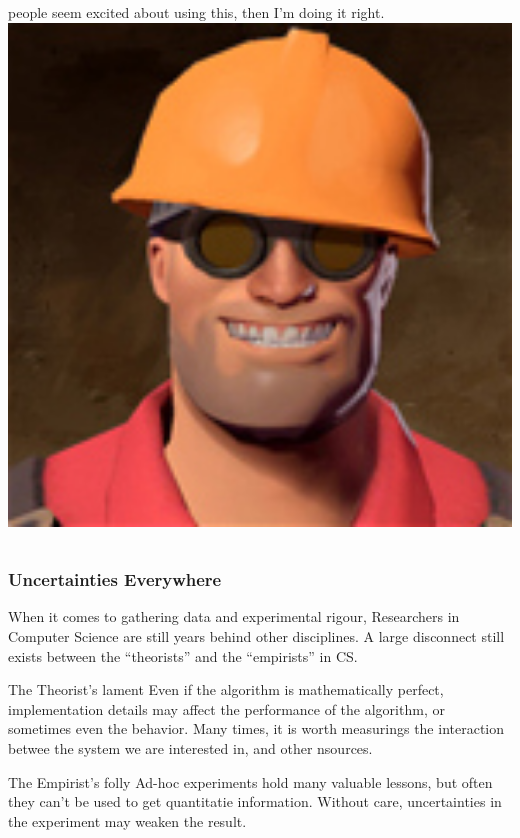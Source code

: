 \documentclass{beamer}
\begin{document}
\begin{frame}
\begin{block}{}
\begin{columns}[c]
      people seem excited about using this, then I'm doing it right.
      \includegraphics[width=1\textwidth]{img/engineer}
    \end{columns}
  \end{block}
\end{frame}

\begin{frame}
  \frametitle{Uncertainties Everywhere}

  When it comes to gathering data and experimental rigour, Researchers
  in Computer Science are still years behind other disciplines. A
  large disconnect still exists between the ``theorists'' and the
  ``empirists'' in CS.

  {\small
  \begin{block}{The Theorist's lament}
    Even if the algorithm is mathematically perfect, implementation
    details may affect the performance of the algorithm, or sometimes
    even the behavior. Many times, it is worth measurings the
    interaction betwee the system we are interested in, and other
    nsources.
  \end{block}
  \begin{block}{\hfill The Empirist's folly}
    Ad-hoc experiments hold many valuable lessons, but often they
    can't be used to get quantitatie information. Without care,
    uncertainties in the experiment may weaken the result.
  \end{block}}
\end{frame}
\end{document}
